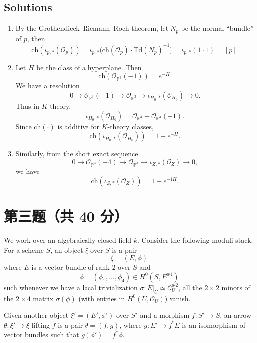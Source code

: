 \subsection*{Solutions}
\begin{enumerate}[label=\arabic*.]
\item By the Grothendieck--Riemann--Roch theorem, let $N_p$ be the normal ``bundle'' of $p$, then
\[
\mathrm{ch}(\iota_{p,*}(\mathcal{O}_p))
=\iota_{p,*}\bigl(\mathrm{ch}(\mathcal{O}_p)\cdot \mathrm{Td}(N_p)^{-1}\bigr)
=\iota_{p,*}(1\cdot 1)=[p].
\]

\item Let $H$ be the class of a hyperplane. Then
\[
\mathrm{ch}(\mathcal{O}_{\mathbb{P}^3}(-1))=e^{-H}.
\]
We have a resolution
\[
0\to \mathcal{O}_{\mathbb{P}^3}(-1)\to \mathcal{O}_{\mathbb{P}^3}\to \iota_{H_0,*}(\mathcal{O}_{H_0})\to 0.
\]
Thus in $K$-theory,
\[
\iota_{H_0,*}(\mathcal{O}_{H_0})=\mathcal{O}_{\mathbb{P}^3}-\mathcal{O}_{\mathbb{P}^3}(-1).
\]
Since $\mathrm{ch}(\cdot)$ is additive for $K$-theory classes,
\[
\mathrm{ch}(\iota_{H_0,*}(\mathcal{O}_{H_0}))=1-e^{-H}.
\]

\item Similarly, from the short exact sequence
\[
0\to \mathcal{O}_{\mathbb{P}^3}(-4)\to \mathcal{O}_{\mathbb{P}^3}\to \iota_{Z,*}(\mathcal{O}_Z)\to 0,
\]
we have
\[
\mathrm{ch}(\iota_{Z,*}(\mathcal{O}_Z))=1-e^{-4H}.
\]
\end{enumerate}

\bigskip

\section*{第三题（共 40 分）}
We work over an algebraically closed field $k$. Consider the following moduli stack.
For a scheme $S$, an object $\xi$ over $S$ is a pair
\[
\xi=(E,\phi)
\]
where $E$ is a vector bundle of rank $2$ over $S$ and
\[
\phi=(\phi_1,\ldots,\phi_4)\in H^0(S,E^{\oplus 4})
\]
such whenever we have a local trivialization $\sigma:E|_U\simeq \mathcal{O}_U^{\oplus 2}$,
all the $2\times 2$ minors of the $2\times 4$ matrix $\sigma(\phi)$ (with entries in $H^0(U,\mathcal{O}_U)$) vanish.

Given another object $\xi'=(E',\phi')$ over $S'$ and a morphism $f:S'\to S$,
an arrow $\theta:\xi'\to \xi$ lifting $f$ is a pair $\theta=(f,g)$, where $g:E'\to f^*E$
is an isomorphism of vector bundles such that $g(\phi')=f^*\phi$.

